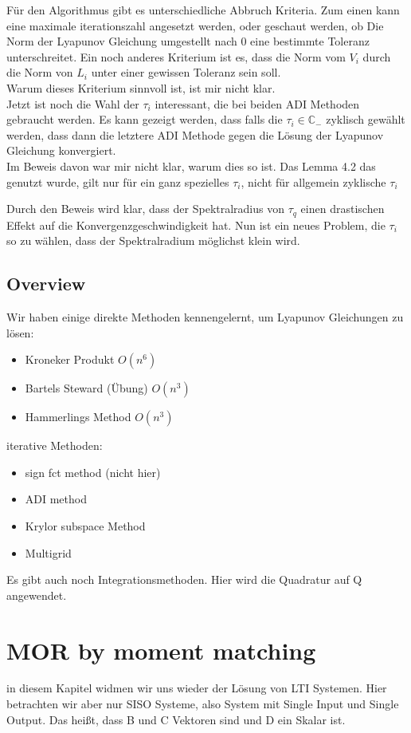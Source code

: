 \documentclass[]{article}
\begin{document}
Für den Algorithmus gibt es unterschiedliche Abbruch Kriteria. Zum einen kann eine maximale iterationszahl angesetzt werden, oder geschaut werden, ob Die Norm der Lyapunov Gleichung umgestellt nach 0 eine bestimmte Toleranz unterschreitet. Ein noch anderes Kriterium ist es, dass die Norm vom $V_i$ durch die Norm von $L_i$ unter einer gewissen Toleranz sein soll. \\

Warum dieses Kriterium sinnvoll ist, ist mir nicht klar. \\

Jetzt ist noch die Wahl der $\tau_i$ interessant, die bei beiden ADI Methoden gebraucht werden. Es kann gezeigt werden, dass falls die $\tau_i \in \mathbb{C}_-$ zyklisch gewählt werden, dass dann die letztere ADI Methode gegen die Lösung der Lyapunov Gleichung konvergiert.\\

Im Beweis davon war mir nicht klar, warum dies so ist. Das Lemma 4.2 das genutzt wurde, gilt nur für ein ganz spezielles $\tau_i$, nicht für allgemein zyklische $\tau_i$ 

Durch den Beweis wird klar, dass der Spektralradius von $\tau_q$ einen drastischen Effekt auf die Konvergenzgeschwindigkeit hat. Nun ist ein neues Problem, die $\tau_i$ so zu wählen, dass der Spektralradium möglichst klein wird.   

\subsection{Overview}
Wir haben einige direkte Methoden kennengelernt, um Lyapunov Gleichungen zu lösen:
\begin{itemize}
	\item Kroneker Produkt $O(n^6)$
	\item Bartels Steward (Übung) $O(n^3)$
	\item Hammerlings Method $O(n^3)$
\end{itemize}
iterative Methoden: 
\begin{itemize}
	\item sign fct method (nicht hier) 
	\item ADI method
	\item Krylor subspace Method
	\item Multigrid
\end{itemize}
Es gibt auch noch Integrationsmethoden. Hier wird die Quadratur auf Q angewendet.
 
\section{MOR by moment matching}
in diesem Kapitel widmen wir uns wieder der Lösung von LTI Systemen. Hier betrachten wir aber nur SISO Systeme, also System mit Single Input und Single Output. Das heißt, dass B und C Vektoren sind und D ein Skalar ist.
\end{document}
